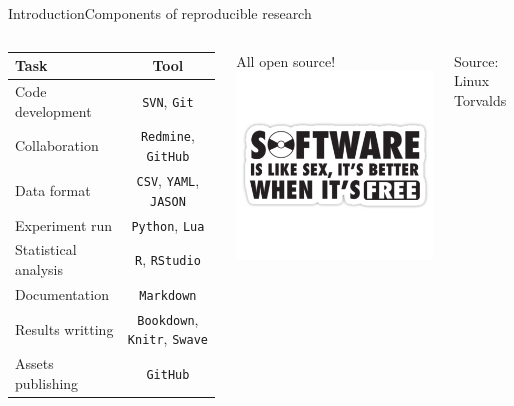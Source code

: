 \documentclass{beamer}
\begin{document}
\begin{frame}[fragile]{Introduction}{Components of reproducible research}
	\begin{columns}
	
	\begin{table}
	\centering
	\small
	\begin{tabular}{|l|c|}\hline
	\textbf{Task}   & \textbf{Tool} \\ \hline
	Code development& \texttt{SVN}, \texttt{Git}  \\ \hline
	Collaboration   & \texttt{Redmine}, \texttt{GitHub}  \\ \hline
    Data format     & \texttt{CSV}, \texttt{YAML}, \texttt{JASON} \\ \hline
    Experiment run  & \texttt{Python}, \texttt{Lua}   \\ \hline
    Statistical analysis  & \texttt{R}, \texttt{RStudio}   \\ \hline
	Documentation & \texttt{Markdown}   \\ \hline
	Results writting	  & \texttt{Bookdown}, \texttt{Knitr}, \texttt{Swave} \\ \hline
	Assets publishing & \texttt{GitHub}\\ \hline
	\end{tabular}
	\end{table}
	
	\centering
	All open source!
	\vspace{-1cm}
	\includegraphics[width=1\textwidth]{figs/sofwareSex.png}\\
	\begin{tiny}Source: Linux Torvalds\end{tiny}
      \end{columns}
\end{frame}
\end{document}
